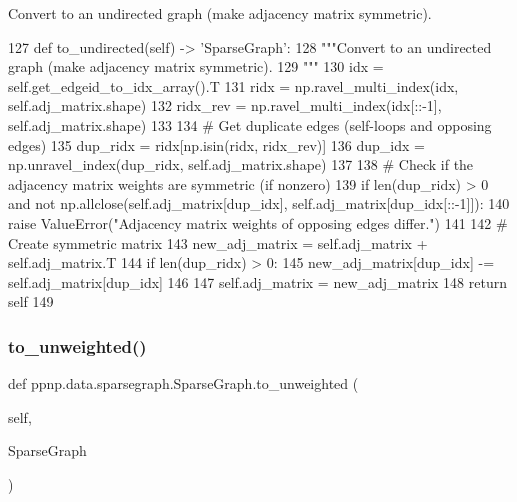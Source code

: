 \begin{DoxyVerb}Convert to an undirected graph (make adjacency matrix symmetric).
\end{DoxyVerb}
 
\begin{DoxyCode}
127     \textcolor{keyword}{def }to\_undirected(self) -> 'SparseGraph':
128         \textcolor{stringliteral}{"""Convert to an undirected graph (make adjacency matrix symmetric).}
129 \textcolor{stringliteral}{        """}
130         idx = self.get\_edgeid\_to\_idx\_array().T
131         ridx = np.ravel\_multi\_index(idx, self.adj\_matrix.shape)
132         ridx\_rev = np.ravel\_multi\_index(idx[::-1], self.adj\_matrix.shape)
133 
134         \textcolor{comment}{# Get duplicate edges (self-loops and opposing edges)}
135         dup\_ridx = ridx[np.isin(ridx, ridx\_rev)]
136         dup\_idx = np.unravel\_index(dup\_ridx, self.adj\_matrix.shape)
137 
138         \textcolor{comment}{# Check if the adjacency matrix weights are symmetric (if nonzero)}
139         \textcolor{keywordflow}{if} len(dup\_ridx) > 0 \textcolor{keywordflow}{and} \textcolor{keywordflow}{not} np.allclose(self.adj\_matrix[dup\_idx], self.adj\_matrix[dup\_idx[::-1]]):
140             \textcolor{keywordflow}{raise} ValueError(\textcolor{stringliteral}{"Adjacency matrix weights of opposing edges differ."})
141 
142         \textcolor{comment}{# Create symmetric matrix}
143         new\_adj\_matrix = self.adj\_matrix + self.adj\_matrix.T
144         \textcolor{keywordflow}{if} len(dup\_ridx) > 0:
145             new\_adj\_matrix[dup\_idx] -= self.adj\_matrix[dup\_idx]
146 
147         self.adj\_matrix = new\_adj\_matrix
148         \textcolor{keywordflow}{return} self
149 
\end{DoxyCode}
\mbox{\label{classppnp_1_1data_1_1sparsegraph_1_1SparseGraph_a5b442d53f41dc373703f39ed1c4a39f4}} 
\subsubsection{\texorpdfstring{to\+\_\+unweighted()}{to\_unweighted()}}
{\footnotesize\ttfamily def ppnp.\+data.\+sparsegraph.\+Sparse\+Graph.\+to\+\_\+unweighted (\begin{DoxyParamCaption}\item[{}]{self,  }\item[{}]{Sparse\+Graph }\end{DoxyParamCaption})}

